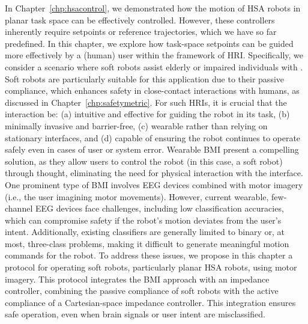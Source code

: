 \begin{foreword}
    In Chapter~\ref{chp:hsacontrol}, we demonstrated how the motion of \gls{HSA} robots in planar task space can be effectively controlled. However, these controllers inherently require setpoints or reference trajectories, which we have so far predefined. In this chapter, we explore how task-space setpoints can be guided more effectively by a (human) user within the framework of \gls{HRI}. Specifically, we consider a scenario where soft robots assist elderly or impaired individuals with . Soft robots are particularly suitable for this application due to their passive compliance, which enhances safety in close-contact interactions with humans, as discussed in Chapter~\ref{chp:safetymetric}.
    For such \glspl{HRI}, it is crucial that the interaction be: (a) intuitive and effective for guiding the robot in its task, (b) minimally invasive and barrier-free, (c) wearable rather than relying on stationary interfaces, and (d) capable of ensuring the robot continues to operate safely even in cases of user or system error. Wearable \gls{BMI} present a compelling solution, as they allow users to control the robot (in this case, a soft robot) through thought, eliminating the need for physical interaction with the interface. One prominent type of \gls{BMI} involves \gls{EEG} devices combined with motor imagery (i.e., the user imagining motor movements).
    However, current wearable, few-channel \gls{EEG} devices face challenges, including low classification accuracies, which can compromise safety if the robot’s motion deviates from the user’s intent. Additionally, existing classifiers are generally limited to binary or, at most, three-class problems, making it difficult to generate meaningful motion commands for the robot.
    To address these issues, we propose in this chapter a protocol for operating soft robots, particularly planar \gls{HSA} robots, using motor imagery. This protocol integrates the \gls{BMI} approach with an impedance controller, combining the passive compliance of soft robots with the active compliance of a Cartesian-space impedance controller. This integration ensures safe operation, even when brain signals or user intent are misclassified.
\end{foreword}

\pagebreak

